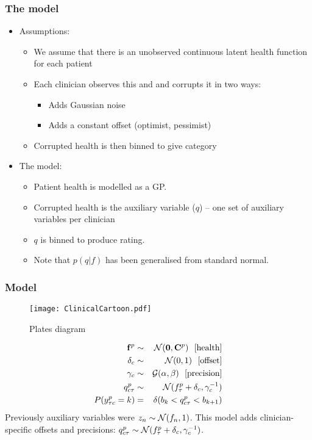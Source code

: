 \begin{frame}
	\frametitle{The model}
		\begin{itemize}
		\item Assumptions:
			\begin{itemize}
				\item We assume that there is an unobserved continuous latent health function for each patient
				\item Each clinician observes this and and corrupts it in two ways:
					\begin{itemize}
						\item Adds Gaussian noise
						\item Adds a constant offset (optimist, pessimist)
					\end{itemize}
				\item Corrupted health is then binned to give category
			\end{itemize}
		\item<2-> The model:
		\begin{itemize}
			\item Patient health is modelled as a GP.
			\item Corrupted health is the auxiliary variable ($q$) -- one set of auxiliary variables per clinician
			\item $q$ is binned to produce rating.
			\item Note that $p(q|f)$ has been generalised from standard normal.
		\end{itemize}
	\end{itemize}
\end{frame}

\begin{frame}
	\frametitle{Model}
	\begin{multicols}{2}
		\begin{figure}[tbh]
			\centering\texttt{[image: ClinicalCartoon.pdf]}
			\centering\caption{\label{fig:clincartoon}Plates diagram}
		\end{figure}
		\newpage
		\begin{eqnarray}
			\nonumber \mathbf{f}^p &\sim & {\cal N}(\mathbf{0},\mathbf{C}^p)~~\mbox{[health]}\\
			\nonumber \delta_c &\sim & {\cal N}(0,1)~~\mbox{[offset]}\\
			\nonumber \gamma_c &\sim & {\cal G}(\alpha,\beta)~~\mbox{[precision]}\\
			\nonumber q_{c\tau}^p &\sim & {\cal N}(f_\tau^p + \delta_c,\gamma_c^{-1})\\
			\nonumber P(y_{\tau c}^p=k) &=& \delta(b_k < q_{c\tau}^p < b_{k+1})
		\end{eqnarray}
		Previously auxiliary variables were $z_n\sim {\cal N}(f_n,1)$. This model adds clinician-specific offsets and precisions: $q_{c\tau}^p \sim  {\cal N}(f_\tau^p + \delta_c,\gamma_c^{-1})$.
	\end{multicols}
\end{frame}

